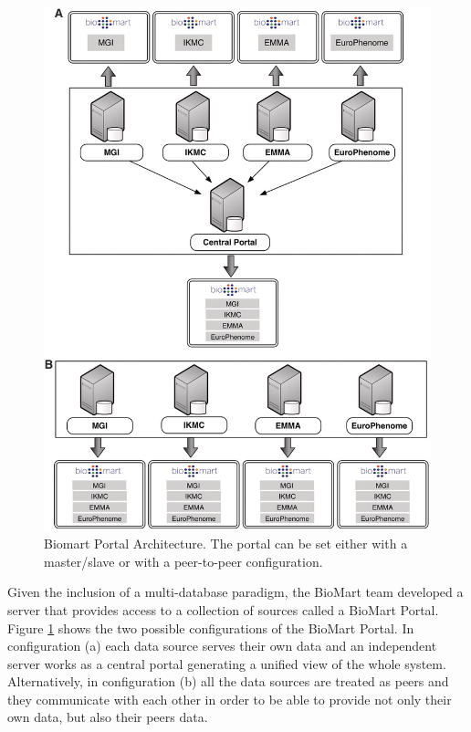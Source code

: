 \begin{figure}  
\centering
\includegraphics[width=\textwidth]{figures/biomart.png}
\caption[Biomart Portal Architecture.]{Biomart Portal Architecture. The portal can be set either with a master/slave or with a peer-to-peer configuration.
\label{fig:biomart}}
\end{figure}

Given the inclusion of a multi-database paradigm, the BioMart team developed a server that provides access to a collection of sources called a BioMart Portal. Figure \ref{fig:biomart} shows the two possible configurations of the BioMart Portal. In configuration (a) each data source serves their own data and an independent server works as a central portal generating a unified view of the whole system. Alternatively, in configuration (b) all the data sources are treated as peers and they communicate with each other in order to be able to provide not only their own data, but also their peers data.

